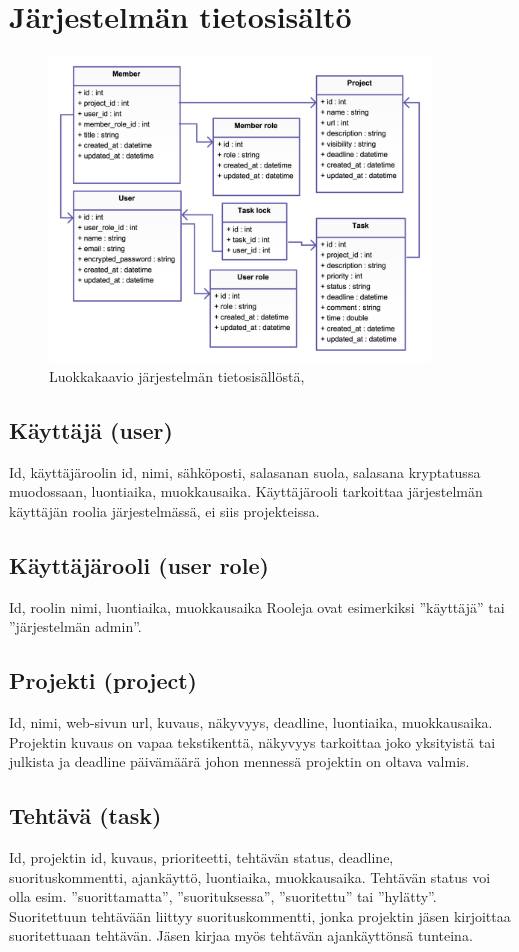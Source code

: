 \documentclass[12pt,a4paper]{article}
\begin{document}
\section*{Järjestelmän tietosisältö}
\begin{figure}[h!]
	\centering
	\caption{Luokkakaavio järjestelmän tietosisällöstä,}
	\includegraphics[width=0.9\textwidth]{luokkakaavio.pdf}
\end{figure}

\subsection*{Käyttäjä (user)}
Id, käyttäjäroolin id, nimi, sähköposti, salasanan suola, salasana kryptatussa muodossaan, luontiaika,
muokkausaika.
Käyttäjärooli tarkoittaa järjestelmän käyttäjän roolia järjestelmässä, ei siis projekteissa.
\subsection*{Käyttäjärooli (user role)}
Id, roolin nimi, luontiaika, muokkausaika
Rooleja ovat esimerkiksi ”käyttäjä” tai ”järjestelmän admin”.
\subsection*{Projekti (project)}
Id, nimi, web-sivun url, kuvaus, näkyvyys, deadline, luontiaika, muokkausaika.
Projektin kuvaus on vapaa tekstikenttä, näkyvyys tarkoittaa joko yksityistä tai julkista ja deadline
päivämäärä johon mennessä projektin on oltava valmis.
\subsection*{Tehtävä (task)}
Id, projektin id, kuvaus, prioriteetti, tehtävän status, deadline, suorituskommentti, ajankäyttö,
luontiaika, muokkausaika.
Tehtävän status voi olla esim. ”suorittamatta”, ”suorituksessa”, ”suoritettu” tai ”hylätty”.
Suoritettuun tehtävään liittyy suorituskommentti, jonka projektin jäsen kirjoittaa suoritettuaan
tehtävän. Jäsen kirjaa myös tehtävän ajankäyttönsä tunteina.
\end{document}
